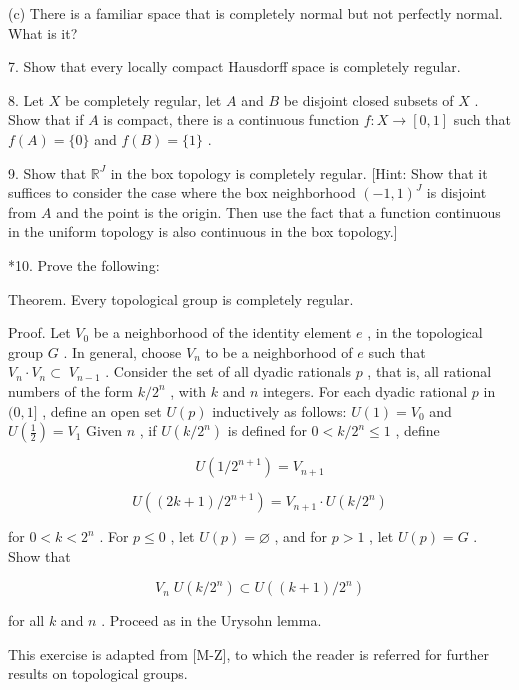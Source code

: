 \documentclass[10pt]{article}
\begin{document}
(c) There is a familiar space that is completely normal but not perfectly normal. What is it?

7. Show that every locally compact Hausdorff space is completely regular.

8. Let \(X\) be completely regular, let \(A\) and \(B\) be disjoint closed subsets of \(X\) . Show that if \(A\) is compact, there is a continuous function \(f : X \rightarrow  \left\lbrack  {0,1}\right\rbrack\) such that \(f\left( A\right)  = \{ 0\}\) and \(f\left( B\right)  = \{ 1\}\) .

9. Show that \({\mathbb{R}}^{J}\) in the box topology is completely regular. [Hint: Show that it suffices to consider the case where the box neighborhood \({\left( -1,1\right) }^{J}\) is disjoint from \(A\) and the point is the origin. Then use the fact that a function continuous in the uniform topology is also continuous in the box topology.]

*10. Prove the following:

Theorem. Every topological group is completely regular.

Proof. Let \({V}_{0}\) be a neighborhood of the identity element \(e\) , in the topological group \(G\) . In general, choose \({V}_{n}\) to be a neighborhood of \(e\) such that \({V}_{n} \cdot  {V}_{n} \subset \; {V}_{n - 1}\) . Consider the set of all dyadic rationals \(p\) , that is, all rational numbers of the form \(k/{2}^{n}\) , with \(k\) and \(n\) integers. For each dyadic rational \(p\) in \((0,1\rbrack\) , define an open set \(U\left( p\right)\) inductively as follows: \(U\left( 1\right)  = {V}_{0}\) and \(U\left( \frac{1}{2}\right)  = {V}_{1}\) Given \(n\) , if \(U\left( {k/{2}^{n}}\right)\) is defined for \(0 < k/{2}^{n} \leq  1\) , define

\[
U\left( {1/{2}^{n + 1}}\right)  = {V}_{n + 1}
\]

\[
U\left( {\left( {{2k} + 1}\right) /{2}^{n + 1}}\right)  = {V}_{n + 1} \cdot  U\left( {k/{2}^{n}}\right)
\]

for \(0 < k < {2}^{n}\) . For \(p \leq  0\) , let \(U\left( p\right)  = \varnothing\) , and for \(p > 1\) , let \(U\left( p\right)  = G\) . Show that

\[
{V}_{n}\;U\left( {k/{2}^{n}}\right)  \subset  U\left( {\left( {k + 1}\right) /{2}^{n}}\right)
\]

for all \(k\) and \(n\) . Proceed as in the Urysohn lemma.

This exercise is adapted from [M-Z], to which the reader is referred for further results on topological groups.
\end{document}
